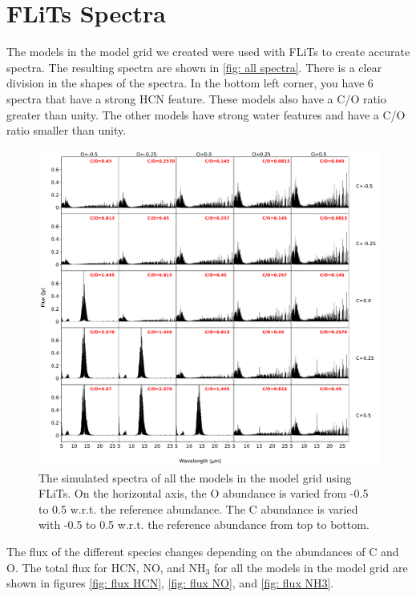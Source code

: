 \documentclass[oneside, single, authoryear, semicolon]{lion-msc}
\newcommand{\4}{$_4$}
\newcommand{\3}{$_3$}
\newcommand{\2}{$_2$}
\begin{document}
\section{FLiTs Spectra}
The models in the model grid we created were used with FLiTs to create accurate spectra. The resulting spectra are shown in \autoref{fig: all spectra}. There is a clear division in the shapes of the spectra. In the bottom left corner, you have 6 spectra that have a strong HCN feature. These models also have a C/O ratio greater than unity. The other models have strong water features and have a C/O ratio smaller than unity. 

\begin{figure}[!ht]
    \centering
    \includegraphics[width=\linewidth]{Figures/All_spectra.pdf}
    \caption{The simulated spectra of all the models in the model grid using FLiTs. On the horizontal axis, the O abundance is varied from -0.5 to 0.5 w.r.t. the reference abundance. The C abundance is varied with -0.5 to 0.5 w.r.t. the reference abundance from top to bottom.}
    \label{fig: all spectra}
\end{figure}

The flux of the different species changes depending on the abundances of C and O. The total flux for HCN, NO, and NH\3 for all the models in the model grid are shown in figures \ref{fig: flux HCN}, \ref{fig: flux NO}, and \ref{fig: flux NH3}. 
\end{document}
